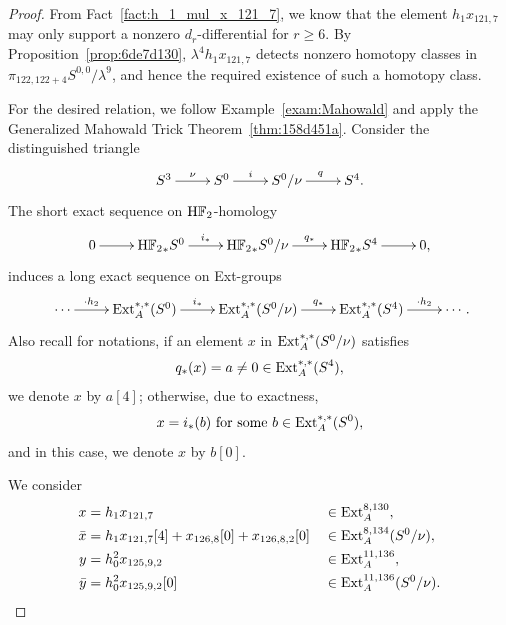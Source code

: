 \documentclass{amsart}
\numberwithin{equation}{section}
\newcommand{\HF}{\mathrm{H}\bF_2}
\begin{document}
\begin{proof}
    From Fact~\ref{fact:h_1_mul_x_121_7}, we know that the element $h_1x_{121,7}$ may only support a nonzero $d_r$-differential for $r \ge 6$. By Proposition~\ref{prop:6de7d130}, $\lambda^4 h_1 x_{121,7}$ detects nonzero homotopy classes in $\pi_{122,122+4}S^{0,0}/\lambda^9$, and hence the required existence of such a homotopy class.

    For the desired relation, we follow Example~\ref{exam:Mahowald} and apply the Generalized Mahowald Trick Theorem~\ref{thm:158d451a}. Consider the distinguished triangle
        $$\xymatrix{S^3 \ar[r]^{\nu} & S^0 \ar[r]^-{i} & S^0/\nu \ar[r]^{q} & S^4.}$$
The short exact sequence on $\HF$-homology
$$\xymatrix{0 \ar[r] & {\HF}_*S^0 \ar[r]^-{i_*} & {\HF}_*S^0/\nu \ar[r]^-{q_*} & {\HF}_*S^4 \ar[r] & 0,}$$
induces a long exact sequence on Ext-groups
$$\xymatrix{\cdots \ar[r]^-{\cdot h_2} & {\Ext}_A^{*,*}(S^0) \ar[r]^-{i_*} & {\Ext}_A^{*,*}(S^0/\nu) \ar[r]^-{q_*} & {\Ext}_A^{*,*}(S^4) \ar[r]^-{\cdot h_2} & \cdots}.$$
Also recall for notations, if an element $x$ in ${\mathrm{Ext}}_A^{*,*}(S^0/\nu)$ satisfies 
$$q_*(x) = a \neq 0 \in \mathrm{Ext}_A^{*,*}(S^4),$$ 
we denote $x$ by $a[4]$; otherwise, due to exactness, 
$$x = i_*(b) \ \text{for some} \ b \in \Ext_A^{*,*}(S^0),$$
and in this case, we denote $x$ by $b[0]$. 

We consider
\begin{align*}
x & = h_1 x_{121,7} && \in \mathrm{Ext}_A^{8,130},\\
\bar{x} & =h_1 x_{121,7} [4] + x_{126,8}[0] + x_{126,8,2}[0] && \in \mathrm{Ext}_A^{8,134}(S^0/\nu), \\
y & =h_0^2 x_{125,9,2} && \in \mathrm{Ext}_A^{11,136} ,\\
        \bar{y} & =h_0^2 x_{125,9,2}[0] && \in \mathrm{Ext}_A^{11,136}(S^0/\nu). 
  \end{align*}      


\end{proof}
\end{document}
